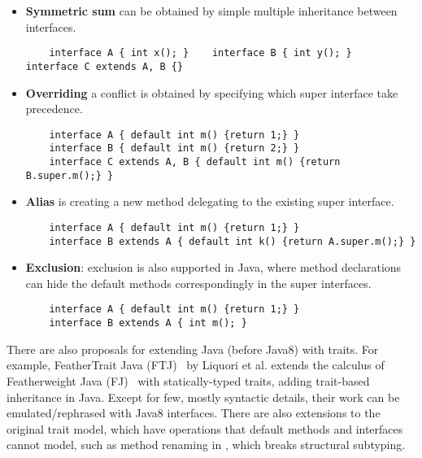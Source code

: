 \newcommand\shortItem{\vspace{-1ex}}
\begin{itemize}
\item \textbf{Symmetric sum} can be obtained by simple multiple inheritance between interfaces.
\shortItem
    \begin{lstlisting}
    interface A { int x(); }    interface B { int y(); }    interface C extends A, B {}
    \end{lstlisting}
\shortItem
\item \textbf{Overriding} a conflict is obtained by specifying which super interface take precedence.
\shortItem
    \begin{lstlisting}
    interface A { default int m() {return 1;} } 
    interface B { default int m() {return 2;} }
    interface C extends A, B { default int m() {return B.super.m();} }
    \end{lstlisting}
\shortItem
\item \textbf{Alias} is creating  a new method delegating to the existing super interface.
\shortItem
    \begin{lstlisting}
    interface A { default int m() {return 1;} }
    interface B extends A { default int k() {return A.super.m();} }
    \end{lstlisting}
\shortItem

\item \textbf{Exclusion}: exclusion is also supported in Java, where method declarations can hide the default methods correspondingly in the super interfaces.
\shortItem
    \begin{lstlisting}
    interface A { default int m() {return 1;} }
    interface B extends A { int m(); }
    \end{lstlisting}
\shortItem
\end{itemize}

There are also proposals for extending Java (before Java8) with traits. For
example, FeatherTrait Java (FTJ)~\cite{Liquori08ftj} by Liquori et al. extends
the calculus of Featherweight Java (FJ)~\cite{Igarashi01FJ} with
statically-typed traits, adding trait-based inheritance in Java.  Except for
few, mostly syntactic details, their work can be emulated/rephrased with Java8
interfaces.  There are also extensions to the original trait model, which have
operations that default methods and interfaces cannot model, such as method
renaming in \cite{reppy2006foundation}, which breaks structural subtyping.

